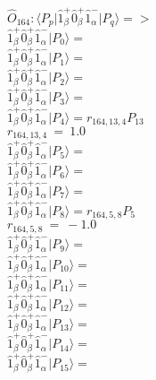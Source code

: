 \documentclass[14pt]{article}
\begin{document}
    $\hat{O}_{164}:  \langle{P_p}\vert \hat{1}_{\beta}^{+}\hat{0}_{\beta}^{+}\hat{1}_{\alpha}^{-} \vert{P_q}\rangle => $ \\ 
    $ \hat{1}_{\beta}^{+}\hat{0}_{\beta}^{+}\hat{1}_{\alpha}^{-} \vert{P_{0}}\rangle =  $ \\ 
    $ \hat{1}_{\beta}^{+}\hat{0}_{\beta}^{+}\hat{1}_{\alpha}^{-} \vert{P_{1}}\rangle =  $ \\ 
    $ \hat{1}_{\beta}^{+}\hat{0}_{\beta}^{+}\hat{1}_{\alpha}^{-} \vert{P_{2}}\rangle =  $ \\ 
    $ \hat{1}_{\beta}^{+}\hat{0}_{\beta}^{+}\hat{1}_{\alpha}^{-} \vert{P_{3}}\rangle =  $ \\ 
    $ \hat{1}_{\beta}^{+}\hat{0}_{\beta}^{+}\hat{1}_{\alpha}^{-} \vert{P_{4}}\rangle = {r}_{164,13,4}P_{13} $ \\ 
    ${r}_{164,13,4}\ =\ 1.0 $ \\ 
    $ \hat{1}_{\beta}^{+}\hat{0}_{\beta}^{+}\hat{1}_{\alpha}^{-} \vert{P_{5}}\rangle =  $ \\ 
    $ \hat{1}_{\beta}^{+}\hat{0}_{\beta}^{+}\hat{1}_{\alpha}^{-} \vert{P_{6}}\rangle =  $ \\ 
    $ \hat{1}_{\beta}^{+}\hat{0}_{\beta}^{+}\hat{1}_{\alpha}^{-} \vert{P_{7}}\rangle =  $ \\ 
    $ \hat{1}_{\beta}^{+}\hat{0}_{\beta}^{+}\hat{1}_{\alpha}^{-} \vert{P_{8}}\rangle = {r}_{164,5,8}P_{5} $ \\ 
    ${r}_{164,5,8}\ =\ -1.0 $ \\ 
    $ \hat{1}_{\beta}^{+}\hat{0}_{\beta}^{+}\hat{1}_{\alpha}^{-} \vert{P_{9}}\rangle =  $ \\ 
    $ \hat{1}_{\beta}^{+}\hat{0}_{\beta}^{+}\hat{1}_{\alpha}^{-} \vert{P_{10}}\rangle =  $ \\ 
    $ \hat{1}_{\beta}^{+}\hat{0}_{\beta}^{+}\hat{1}_{\alpha}^{-} \vert{P_{11}}\rangle =  $ \\ 
    $ \hat{1}_{\beta}^{+}\hat{0}_{\beta}^{+}\hat{1}_{\alpha}^{-} \vert{P_{12}}\rangle =  $ \\ 
    $ \hat{1}_{\beta}^{+}\hat{0}_{\beta}^{+}\hat{1}_{\alpha}^{-} \vert{P_{13}}\rangle =  $ \\ 
    $ \hat{1}_{\beta}^{+}\hat{0}_{\beta}^{+}\hat{1}_{\alpha}^{-} \vert{P_{14}}\rangle =  $ \\ 
    $ \hat{1}_{\beta}^{+}\hat{0}_{\beta}^{+}\hat{1}_{\alpha}^{-} \vert{P_{15}}\rangle =  $ \\ 
    
\end{document}

